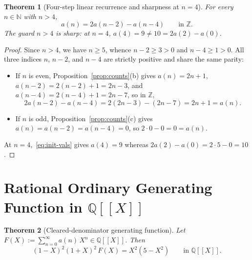 \documentclass[11pt]{article}
\newcommand{\llbracket}{[\![}
\newcommand{\rrbracket}{]\!]}
\newtheorem{theorem}{Theorem}[section]
\theoremstyle{definition}
\newcommand{\N}{\mathbb{N}}
\newcommand{\Z}{\mathbb{Z}}
\newcommand{\Q}{\mathbb{Q}}
\begin{document}
\begin{theorem}[Four-step linear recurrence and sharpness at $n = 4$]
\label{thm:recurrence}
For every $n \in \N$ with $n > 4$,
\[
a(n) = 2a(n - 2) - a(n - 4) \qquad \text{in }\Z.
\]
The guard $n > 4$ is sharp: at $n = 4$, $a(4) = 9 \ne 10 = 2a(2) - a(0)$.
\end{theorem}

\begin{proof}
Since $n > 4$, we have $n \ge 5$, whence $n - 2 \ge 3 > 0$ and $n - 4 \ge 1 > 0$. All three indices $n$, $n - 2$, and $n - 4$ are strictly positive and share the same parity:
\begin{itemize}
\item If $n$ is even, Proposition~\ref{prop:counts}(b) gives $a(n) = 2n + 1$, $a(n - 2) = 2(n - 2) + 1 = 2n - 3$, and $a(n - 4) = 2(n - 4) + 1 = 2n - 7$, so in $\Z$,
\[
2a(n - 2) - a(n - 4) = 2(2n - 3) - (2n - 7) = 2n + 1 = a(n).
\]
\item If $n$ is odd, Proposition~\ref{prop:counts}(c) gives $a(n) = a(n - 2) = a(n - 4) = 0$, so $2\cdot 0 - 0 = 0 = a(n)$.
\end{itemize}
At $n = 4$,~\eqref{eq:init-vals} gives $a(4) = 9$ whereas $2a(2) - a(0) = 2\cdot 5 - 0 = 10$.
\end{proof}

\section{Rational Ordinary Generating Function in \texorpdfstring{$\Q\llbracket X \rrbracket$}{Q[[X]]}}

\begin{theorem}[Cleared-denominator generating function]
\label{thm:gf}
Let $F(X) := \sum_{n=0}^{\infty} a(n)\,X^n \in \Q\llbracket X \rrbracket$. Then
\begin{equation}
\label{eq:gf-cleared}
(1 - X)^2 (1 + X)^2 \, F(X) = X^2 (5 - X^2) \qquad \text{in }\Q\llbracket X \rrbracket.
\end{equation}
\end{theorem}
\end{document}
